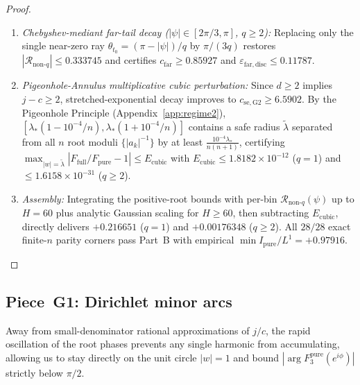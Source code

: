 \documentclass[10pt]{article}
\numberwithin{equation}{section}
\theoremstyle{plain}
\theoremstyle{definition}
\newcommand{\dd}{\mathrm{d}}
\newcommand{\1}{\mathbf{1}}
\begin{document}
\begin{proof}
\begin{enumerate}[label=\textbf{G2.\arabic*},leftmargin=2.8em]
    \begin{equation}\label{eq:cr-monotone}
    \frac{\dd}{\dd y}\, V(x_*(y), y) = \frac{U_x^2 + U_y^2}{U_x} < 0 \qquad (\forall y \ge 0).
    \end{equation}
    Shifting to $H_\pi$ ($-V = \pi$) on Case~1 rays therefore encloses exact zero count $1$, while shifting to $H_{3\theta_t/4}$ on Case~2 rays encloses exact zero count $0$, certifying $|\mathcal{R}_{\mathrm{non}\text{-}q}| \le 0.115416$ ($|\psi| \le 1.25$) and $\le 0.333745$ ($|\psi| \le 2\pi/3$).
    \item \emph{Chebyshev-mediant far-tail decay ($|\psi| \in [2\pi/3, \pi]$, $q \ge 2$):} Replacing only the single near-zero ray $\theta_{t_0} = (\pi - |\psi|)/q$ by $\pi/(3q)$ restores $|\mathcal{R}_{\mathrm{non}\text{-}q}| \le 0.333745$ and certifies $c_{\mathrm{far}} \ge 0.85927$ and $\varepsilon_{\mathrm{far,disc}} \le 0.11787$.
    \item \emph{Pigeonhole-Annulus multiplicative cubic perturbation:} Since $d \ge 2$ implies $j - c \ge 2$, stretched-exponential decay improves to $c_{\mathrm{se,G2}} \ge 6.5902$. By the Pigeonhole Principle (Appendix~\ref{app:regime2}), $[\lambda_*(1 - 10^{-4}/n), \lambda_*(1 + 10^{-4}/n)]$ contains a safe radius $\tilde{\lambda}$ separated from all $n$ root moduli $\{|a_k|^{-1}\}$ by at least $\frac{10^{-4}\lambda_*}{n(n+1)}$, certifying $\max_{|w|=\tilde{\lambda}} |F_{\mathrm{full}}/F_{\mathrm{pure}} - 1| \le E_{\mathrm{cubic}}$ with $E_{\mathrm{cubic}} \le 1.8182 \times 10^{-12}$ ($q = 1$) and $\le 1.6158 \times 10^{-31}$ ($q \ge 2$).
    \item \emph{Assembly:} Integrating the positive-root bounds with per-bin $\mathcal{R}_{\mathrm{non}\text{-}q}(\psi)$ up to $H = 60$ plus analytic Gaussian scaling for $H \ge 60$, then subtracting $E_{\mathrm{cubic}}$, directly delivers $+0.216651$ ($q = 1$) and $+0.00176348$ ($q \ge 2$). All $28/28$ exact finite-$n$ parity corners pass Part~B with empirical $\min I_{\mathrm{pure}}/L^1 = +0.97916$. \qedhere
\end{enumerate}
\end{proof}

\subsection{Piece~G1: Dirichlet minor arcs}
\label{sec:G1}

Away from small-denominator rational approximations of $j/c$, the rapid oscillation of the root phases prevents any single harmonic from accumulating, allowing us to stay directly on the unit circle $|w| = 1$ and bound $|\arg F_3^{\mathrm{pure}}(e^{i\phi})|$ strictly below $\pi/2$.
\end{document}
